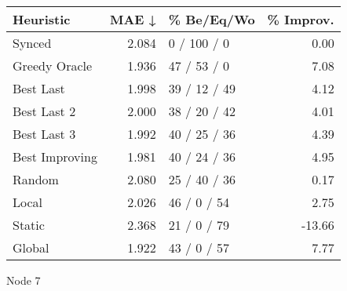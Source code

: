 \begin{tabular}{lrlr}
\toprule
\textbf{Heuristic} & \textbf{MAE ↓} & \textbf{\% Be/Eq/Wo} & \textbf{\% Improv.} \\
\midrule
            Synced &          2.084 &          0 / 100 / 0 &                0.00 \\
     Greedy Oracle &          1.936 &          47 / 53 / 0 &                7.08 \\
         Best Last &          1.998 &         39 / 12 / 49 &                4.12 \\
       Best Last 2 &          2.000 &         38 / 20 / 42 &                4.01 \\
       Best Last 3 &          1.992 &         40 / 25 / 36 &                4.39 \\
    Best Improving &          1.981 &         40 / 24 / 36 &                4.95 \\
            Random &          2.080 &         25 / 40 / 36 &                0.17 \\
             Local &          2.026 &          46 / 0 / 54 &                2.75 \\
            Static &          2.368 &          21 / 0 / 79 &              -13.66 \\
            Global &          1.922 &          43 / 0 / 57 &                7.77 \\
\bottomrule
\end{tabular}
\caption{Node 7}
\label{tab:ds_non_lr05_le1_bs4_7}
